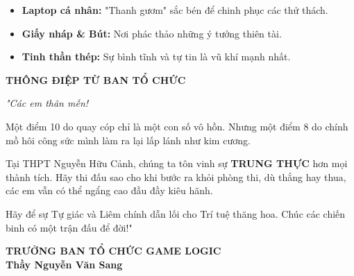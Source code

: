 \documentclass[12pt, a4paper]{article}
\begin{document}
\vspace{0.5cm}

\begin{tcolorbox}[colback=white, colframe=schoolblue, title=\textbf{\large \ding{52} VŨ KHÍ CỦA CHIẾN BINH}]
    \begin{itemize}[label=\color{schoolblue}, leftmargin=*]
        \item \textbf{Laptop cá nhân:} "Thanh gươm" sắc bén để chinh phục các thử thách.
        \item \textbf{Giấy nháp \& Bút:} Nơi phác thảo những ý tưởng thiên tài.
        \item \textbf{Tinh thần thép:} Sự bình tĩnh và tự tin là vũ khí mạnh nhất.
    \end{itemize}
\end{tcolorbox}

\vspace{0.5cm}

\begin{center}
    \begin{minipage}{0.9\textwidth}
        \begin{center}
            {\Large \textbf{\color{successgreen}  THÔNG ĐIỆP TỪ BAN TỔ CHỨC }}
        \end{center}
        \vspace{0.2cm}
        {\itshape
        "Các em thân mến!
        
        Một điểm 10 do quay cóp chỉ là một con số vô hồn. Nhưng một điểm 8 do chính mồ hôi công sức mình làm ra lại lấp lánh như kim cương.
        
        Tại THPT Nguyễn Hữu Cảnh, chúng ta tôn vinh sự \textbf{TRUNG THỰC} hơn mọi thành tích. Hãy thi đấu sao cho khi bước ra khỏi phòng thi, dù thắng hay thua, các em vẫn có thể ngẩng cao đầu đầy kiêu hãnh.
        
        Hãy để sự Tự giác và Liêm chính dẫn lối cho Trí tuệ thăng hoa. Chúc các chiến binh có một trận đấu để đời!"
        }
    \end{minipage}
\end{center}

\vspace{1cm}
\begin{flushright}
    \textbf{TRƯỞNG BAN TỔ CHỨC GAME LOGIC} \\
    \vspace{1.5cm}
    \textbf{Thầy Nguyễn Văn Sang~~~~~~~~~~~~~}
\end{flushright}
\end{document}
